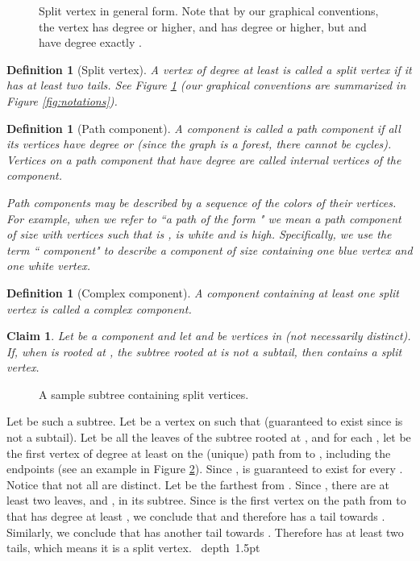 \documentclass[11pt]{article}
\def\Proof{\par\noindent{\bf Proof:~}}
\def\blackslug{\hbox{\hskip 1pt \vrule width 4pt height 8pt
    depth 1.5pt \hskip 1pt}}
\def\QED{\quad\blackslug\lower 8.5pt\null\par}
\newtheorem{definition}[theorem]{Definition}
\newtheorem{claim}[theorem]{Claim}
\theoremstyle{definition}
\begin{document}
\begin{figure}[thbp]
  \caption{\sf Split vertex  in general form.
Note that by our graphical conventions, the vertex  has degree  or higher, and  has degree  or higher, but  and  have degree exactly .}
  \medskip
  \centering
  \label{fig:splitP}
\end{figure}
	
\begin{definition}[Split vertex] 
\label{def:split_vertex}
A vertex of degree at least  is called a \emph{split} vertex if it has at least two tails. See Figure \ref{fig:splitP} (our graphical conventions are summarized in Figure \ref{fig:notations}).
\end{definition}
	
\begin{definition}[Path component] 
A component is called a \emph{path component} if all its vertices have degree  or  
(since the graph is a forest, there cannot be cycles).
Vertices on a path component that have degree  are called \emph{internal vertices} of the component.

Path components may be described by a sequence of the colors of their vertices. 
For example, when we refer to ``\emph{a path of the form }" we mean a path component of size  with vertices  such that  is ,  is white and  is high.
Specifically, we use the term ``\emph{ component}" to describe a component of size  containing one blue vertex and one white vertex. 
\end{definition}
	
\begin{definition}[Complex component] 
A component containing at least one split vertex is called a \emph{complex component}.
\end{definition}


\begin{claim}
\label{claim:every_tree_has_split}
Let  be a component and let  and  be vertices in  (not necessarily distinct).
If, when  is rooted at , the subtree  rooted at  is not a subtail, then  contains a split vertex.
\end{claim}
\begin{figure}[thbp]
  \caption{\sf A sample subtree  containing split vertices.}
  \medskip
  \centering
  \label{fig:subtree_splits}
\end{figure}
\Proof
Let  be such a subtree. Let  be a vertex on  such that  (guaranteed to exist since  is not a subtail).
Let  be all the leaves of the subtree rooted at , and for each , let  be the first vertex of degree at least  on the (unique) path from  to , including the endpoints (see an example in Figure \ref{fig:subtree_splits}). 
Since ,  is guaranteed to exist for every .
Notice that not all  are distinct.
Let  be the  farthest from . 
Since , there are at least two leaves,  and , in its subtree.
Since  is the first vertex on the path from  to  that has degree at least , we conclude that  and therefore  has a tail towards .
Similarly, we conclude that  has another tail towards .
Therefore  has at least two tails, which means it is a split vertex.
\QED
\end{document}
